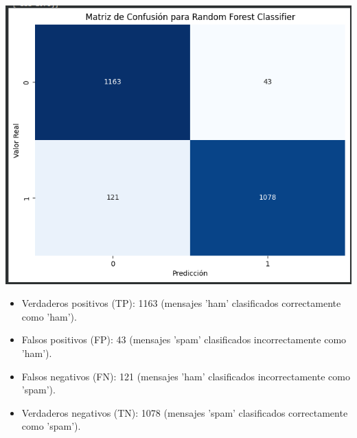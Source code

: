 \begin{center}    
    \includegraphics[scale = .4]{IMA/RandomForestMatriz.png}
\end{center}

\begin{itemize}
\item Verdaderos positivos (TP): 1163 (mensajes 'ham' clasificados correctamente como 'ham').
\item Falsos positivos (FP): 43 (mensajes 'spam' clasificados incorrectamente como 'ham').
\item Falsos negativos (FN): 121 (mensajes 'ham' clasificados incorrectamente como 'spam').
\item Verdaderos negativos (TN): 1078 (mensajes 'spam' clasificados correctamente como 'spam').
\end{itemize}